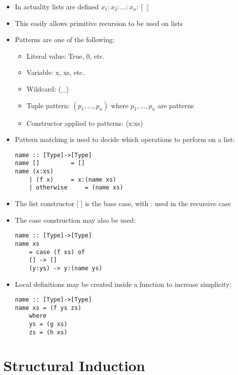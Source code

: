 \documentclass{article}
\begin{document}
\begin{itemize}
\item In actuality lists are defined $x_1:x_2:\ldots:x_n:[\:]$
\item This easily allows primitive recursion to be used on lists
\item Patterns are one of the following:
\begin{itemize}
\item Literal value: True, 0, etc.
\item Variable: x, xs, etc.
\item Wildcard: (\_)
\item Tuple pattern: $(p_1,\ldots,p_n)$ where $p_1,\ldots,p_n$ are patterns
\item Constructor applied to patterns: (x:xs)
\end{itemize}
\item Pattern matching is used to decide which operations to perform on a list:
\begin{lstlisting}
name :: [Type]->[Type]
name [] 		= []
name (x:xs)
	| (f x)		= x:(name xs)
	| otherwise 	= (name xs)
\end{lstlisting}
\item The list constructor [ ] is the base case, with : used in the recursive
case
\item The case construction may also be used:
\begin{lstlisting}
name :: [Type]->[Type]
name xs
    = case (f xs) of
	[] -> []
	(y:ys) -> y:(name ys)
\end{lstlisting}
\item Local definitions may be created inside a function to increase simplicity:
\begin{lstlisting}
name :: [Type]->[Type]
name xs	= (f ys zs)
	where
	ys = (g xs)
	zs = (h xs)
\end{lstlisting}
\end{itemize}

\section{Structural Induction}
\end{document}
